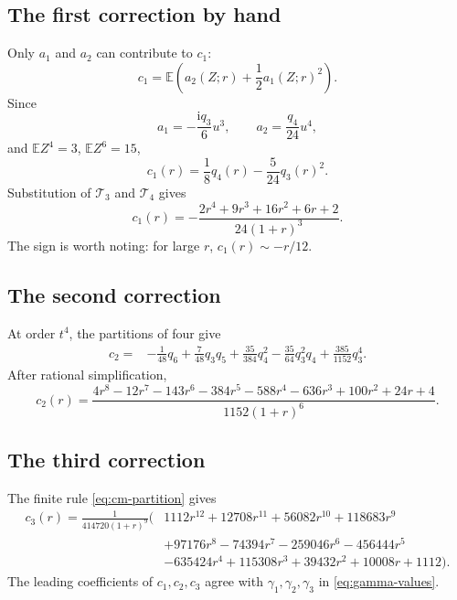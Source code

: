 \documentclass[11pt,a4paper]{article}
\theoremstyle{definition}
\theoremstyle{remark}
\newcommand{\Tch}{\mathscr T}
\newcommand{\E}{\mathbb E}
\newcommand{\ii}{\mathrm i}
\begin{document}
\subsection{The first correction by hand}

Only \(a_1\) and \(a_2\) can contribute to \(c_1\):
\[
 c_1=\E\!\left(a_2(Z;r)+\frac12a_1(Z;r)^2\right).
\]
Since
\[
 a_1=-\frac{\ii q_3}{6}u^3,
 \qquad
 a_2=\frac{q_4}{24}u^4,
\]
and \(\E Z^4=3\), \(\E Z^6=15\),
\begin{equation}\label{eq:c1-q}
 c_1(r)=\frac18q_4(r)-\frac5{24}q_3(r)^2.
\end{equation}
Substitution of \(\Tch_3\) and \(\Tch_4\) gives
\begin{equation}\label{eq:c1-explicit}
 \boxed{
 c_1(r)=
 -\frac{2r^4+9r^3+16r^2+6r+2}{24(1+r)^3}.}
\end{equation}
The sign is worth noting: for large \(r\), \(c_1(r)\sim-r/12\).

\subsection{The second correction}

At order \(t^4\), the partitions of four give
\begin{align}
 c_2={}&-\frac1{48}q_6
 +\frac7{48}q_3q_5
 +\frac{35}{384}q_4^2
 -\frac{35}{64}q_3^2q_4
 +\frac{385}{1152}q_3^4.\label{eq:c2-q}
\end{align}
After rational simplification,
\begin{equation}\label{eq:c2-explicit}
 \boxed{
 c_2(r)=
 \frac{
 4r^8-12r^7-143r^6-384r^5-588r^4-636r^3
 +100r^2+24r+4}
 {1152(1+r)^6}.}
\end{equation}

\subsection{The third correction}

The finite rule \cref{eq:cm-partition} gives
\begin{equation}\label{eq:c3-explicit}
\boxed{
\begin{aligned}
 c_3(r)=\frac{1}{414720(1+r)^9}\bigl(&
 1112r^{12}+12708r^{11}+56082r^{10}+118683r^9\\
 &+97176r^8-74394r^7-259046r^6-456444r^5\\
 &-635424r^4+115308r^3+39432r^2+10008r+1112
 \bigr).
\end{aligned}}
\end{equation}
The leading coefficients of \(c_1,c_2,c_3\) agree with
\(\gamma_1,\gamma_2,\gamma_3\) in \cref{eq:gamma-values}.
\end{document}
